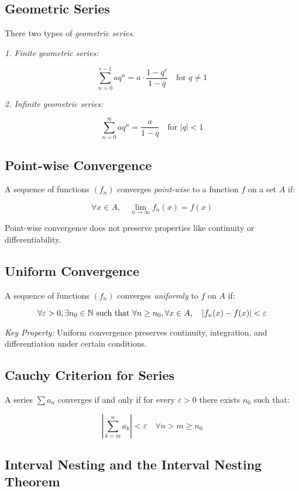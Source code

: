 \subsection{Geometric Series}

There two types of \emph{geometric series}.

\emph{1. Finite geometric series:}

\[
    \sum_{n = 0}^{r - 1} aq^n = a \cdot \frac{1 - q^r}{1 - q} \quad \text{for } q \ne 1
\]

\emph{2. Infinite geometric series:}

\[
    \sum_{n = 0}^{\infty} aq^n = \frac{a}{1 - q} \quad \text{for } |q| < 1
\]

\subsection{Point-wise Convergence}

A sequence of functions \((f_n)\) converges \emph{point-wise} to a function \(f\) on a set \(A\) if:

\[
    \forall x \in A, \quad \lim_{n \to \infty} f_n(x) = f(x)
\]

Point-wise convergence does not preserve properties like continuity or differentiability.

\subsection{Uniform Convergence}

A sequence of functions \((f_n)\) converges \emph{uniformly} to \(f\) on \(A\) if:

\[
    \forall \varepsilon > 0, \exists n_0 \in \mathbb{N} \text{ such that } \forall n \ge n_0, \forall x \in A, \quad |f_n(x) - f(x)| < \varepsilon
\]

\emph{Key Property:} Uniform convergence preserves continuity, integration, and differentiation under 
certain conditions.

\subsection{Cauchy Criterion for Series}

A series \(\sum a_n\) converges if and only if for every \(\varepsilon > 0\) there exists \(n_0\) 
such that:

\[
    \left| \sum_{k = m}^{n} a_k \right| < \varepsilon \quad \forall n > m \ge n_0
\]

\subsection{Interval Nesting and the Interval Nesting Theorem}

